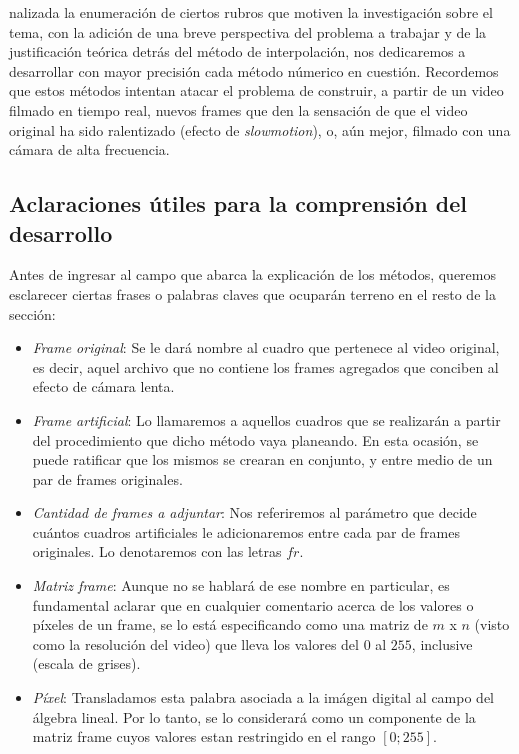 
nalizada la enumeraci\'on de ciertos rubros que motiven la investigaci\'on sobre el tema, con la adici\'on de una breve perspectiva del problema a trabajar y de la justificación teórica detrás del método de interpolación, nos dedicaremos a desarrollar con mayor precisi\'on cada m\'etodo n\'umerico en cuesti\'on. Recordemos que estos métodos intentan atacar el problema de construir, a partir de un video filmado en tiempo real, nuevos frames que den la sensaci\'on de que el video original ha sido ralentizado (efecto de \emph{slowmotion}), o, aún mejor, filmado con una cámara de alta frecuencia.

\subsection{Aclaraciones \'utiles para la comprensi\'on del desarrollo}

Antes de ingresar al campo que abarca la explicaci\'on de los m\'etodos, queremos esclarecer ciertas frases o palabras claves que ocupar\'an terreno en el resto de la secci\'on:

\begin{itemize}
	\item \textit{Frame original}: Se le dar\'a nombre al cuadro que pertenece al video original, es decir, aquel archivo que no contiene los frames agregados que conciben al efecto de c\'amara lenta.
	\item \textit{Frame artificial}: Lo llamaremos a aquellos cuadros que se realizar\'an a partir del procedimiento que dicho m\'etodo vaya planeando. En esta ocasi\'on, se puede ratificar que los mismos se crearan en conjunto, y entre medio de un par de frames originales.
	\item \textit{Cantidad de frames a adjuntar}: Nos referiremos al par\'ametro que decide cu\'antos cuadros artificiales le adicionaremos entre cada par de frames originales. Lo denotaremos con las letras $fr$.
	\item \textit{Matriz frame}: Aunque no se hablar\'a de ese nombre en particular, es fundamental aclarar que en cualquier comentario acerca de los valores o p\'ixeles de un frame, se lo est\'a especificando como una matriz de $m$ x $n$ (visto como la resoluci\'on del video) que lleva los valores del $0$ al $255$, inclusive (escala de grises).
	\item \textit{P\'ixel}: Transladamos esta palabra asociada a la im\'agen digital al campo del \'algebra lineal. Por lo tanto, se lo considerar\'a como un componente de la matriz frame cuyos valores estan restringido en el rango $[0;255]$.
\end{itemize}

